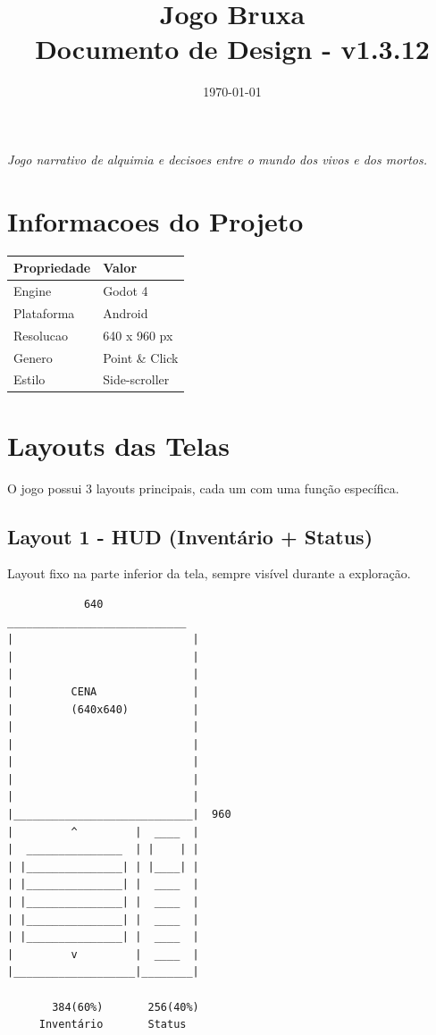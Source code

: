 \documentclass[12pt]{article}
\title{
    \Huge\textbf{Jogo Bruxa} \\
    \Large Documento de Design - v1.3.12
}
\author{}
\date{\today}
\begin{document}
\maketitle

\begin{center}
\large \textit{Jogo narrativo de alquimia e decisoes entre o mundo dos vivos e dos mortos.}
\end{center}

\tableofcontents

\newpage

\section{Informacoes do Projeto}

\begin{tabular}{|l|l|}
\hline
\textbf{Propriedade} & \textbf{Valor} \\
\hline
Engine & Godot 4 \\
Plataforma & Android \\
Resolucao & 640 x 960 px \\
Genero & Point \& Click \\
Estilo & Side-scroller \\
\hline
\end{tabular}

\newpage

\section{Layouts das Telas}

O jogo possui 3 layouts principais, cada um com uma função específica.

\subsection{Layout 1 - HUD (Inventário + Status)}

Layout fixo na parte inferior da tela, sempre visível durante a exploração.

\begin{verbatim}
            640
____________________________
|                            |
|                            |
|                            |
|         CENA               |
|         (640x640)          |
|                            |
|                            |
|                            |
|                            |
|                            |
|____________________________|  960
|         ^         |  ____  |
|  _______________  | |    | |
| |_______________| | |____| |
| |_______________| |  ____  |
| |_______________| |  ____  |
| |_______________| |  ____  |
| |_______________| |  ____  |
|         v         |  ____  |
|___________________|________|

       384(60%)       256(40%)
     Inventário       Status
\end{verbatim}
\end{document}
